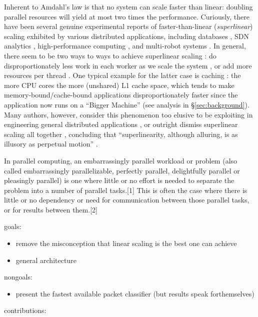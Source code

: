 Inherent to Amdahl's law is that no system can scale faster than linear: doubling parallel resources will yield at most two times the performance. Curiously, there have been several genuine experimental reports of faster-than-linear (\emph{superlinear}) scaling exhibited by various distributed applications, including databases \cite{scalability-analyzed, 10.5555/1012889.1012894}, SDN analytics \cite{sdn-analytitcs}, high-performance computing \cite{556383, 7733347}, and multi-robot systems \cite{10.1007/978-3-319-77610-1}. In general, there seem to be two ways to ways to achieve superlinear scaling \cite{7733347, 80148}: do disproportionately less work in each worker as we scale the system \cite{7733347}, or add more resources per thread \cite{80148}. One typical example for the latter case is caching \cite{271208, 10.5555/1012889.1012894}: the more CPU cores the more (unshared) L1 cache space, which tends to make memory-bound\slash cache-bound applications disproportionately faster since the application now runs on a ``Bigger Machine'' \cite{80148} (see analysis in \S\ref{sec:background}).  Many authors, however, consider this phenomenon too elusive to be exploiting in engineering general distributed applications \cite{gunther-hotsos, 10.1145/2773212.2789974, 7733347, 80148}, or outright dismiss superlinear scaling all together \cite{gunther-hotsos}, concluding that ``superlinearity, although alluring, is as illusory as perpetual motion'' \cite{10.1145/2773212.2789974}.


In parallel computing, an embarrassingly parallel workload or problem (also called embarrassingly parallelizable, perfectly parallel, delightfully parallel or pleasingly parallel) is one where little or no effort is needed to separate the problem into a number of parallel tasks.[1] This is often the case where there is little or no dependency or need for communication between those parallel tasks, or for results between them.[2] 

goals:

\begin{itemize}
\item remove the misconception that linear scaling is the best one can achieve
\item general architecture
\end{itemize}


nongoals:

\begin{itemize}
\item present the fastest available packet classifier (but results speak forthemselves)
\end{itemize}

contributions:




